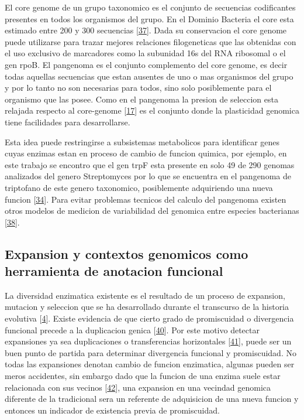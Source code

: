 \documentclass[12pt,twoside]{reedthesis}
\begin{document}
  El core genome de un grupo taxonomico es el conjunto de secuencias
  codificantes presentes en todos los organismos del grupo. En el Dominio
  Bacteria el core esta estimado entre 200 y 300 secuencias
  {[}\protect\hyperlink{ref-halachevux5fcalculatingux5f2011}{37}{]}. Dada
  su conservacion el core genome puede utilizarse para trazar mejores
  relaciones filogeneticas que las obtenidas con el uso exclusivo de
  marcadores como la subunidad 16s del RNA ribosomal o el gen rpoB. El
  pangenoma es el conjunto complemento del core genome, es decir todas
  aquellas secuencias que estan ausentes de uno o mas organismos del grupo
  y por lo tanto no son necesarias para todos, sino solo posiblemente para
  el organismo que las posee. Como en el pangenoma la presion de seleccion
  esta relajada respecto al core-genome
  {[}\protect\hyperlink{ref-firnux5fdarwinianux5f2009}{17}{]} es el
  conjunto donde la plasticidad genomica tiene facilidades para
  desarrollarse.
  
  Esta idea puede restringirse a subsistemas metabolicos para identificar
  genes cuyas enzimas estan en proceso de cambio de funcion quimica, por
  ejemplo, en este trabajo se encontro que el gen trpF esta presente en
  solo 49 de 290 genomas analizados del genero Streptomyces por lo que se
  encuentra en el pangenoma de triptofano de este genero taxonomico,
  posiblemente adquiriendo una nueva funcion
  {[}\protect\hyperlink{ref-maux5funconventionalux5f2013}{34}{]}. Para
  evitar problemas tecnicos del calculo del pangenoma existen otros
  modelos de medicion de variabilidad del genomica entre especies
  bacterianas
  {[}\protect\hyperlink{ref-kislyukux5fgenomicux5f2011}{38}{]}.
  
  \subsection{Expansion y contextos genomicos como herramienta de
  anotacion
  funcional}\label{expansion-y-contextos-genomicos-como-herramienta-de-anotacion-funcional}
  
  La diversidad enzimatica existente es el resultado de un proceso de
  expansion, mutacion y seleccion que se ha desarrollado durante el
  transcurso de la historia evolutiva
  {[}\protect\hyperlink{ref-khersonskyux5fenzymeux5f2010}{4}{]}. Existe
  evidencia de que cierto grado de promiscuidad o divergencia funcional
  precede a la duplicacion genica
  {[}\protect\hyperlink{ref-hughesux5fevolutionux5f1994}{40}{]}. Por este
  motivo detectar expansiones ya sea duplicaciones o transferencias
  horizontales
  {[}\protect\hyperlink{ref-treangenux5fhorizontalux5f2011}{41}{]}, puede
  ser un buen punto de partida para determinar divergencia funcional y
  promiscuidad. No todas las expansiones denotan cambio de funcion
  enzimatica, algunas pueden ser meros accidentes, sin embargo dado que la
  funcion de una enzima suele estar relacionada con sus vecinos
  {[}\protect\hyperlink{ref-overbeekux5fuseux5f1999}{42}{]}, una expansion
  en una vecindad genomica diferente de la tradicional sera un referente
  de adquisicion de una nueva funcion y entonces un indicador de
  existencia previa de promiscuidad.
  
\end{document}
